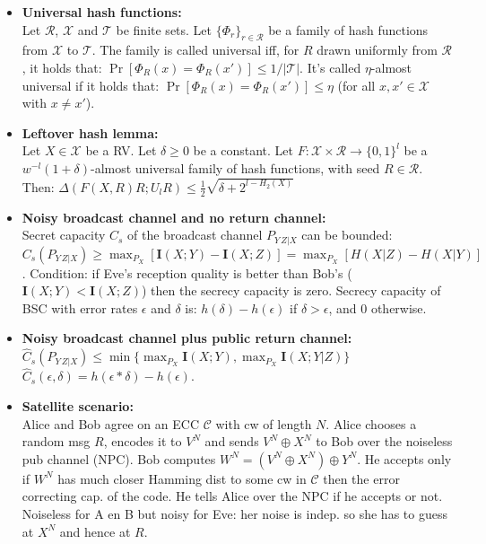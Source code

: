 \documentclass[twocolumn,9pt]{extarticle}
\begin{document}
\begin{itemize}

	\item \textbf{Universal hash functions:} \\
	Let $\mathcal{R}$, $\mathcal{X}$ and $\mathcal{T}$ be finite sets. Let $\{\Phi_r\}_{r \in \mathcal{R}}$ be a family of hash functions from $\mathcal{X}$ to $\mathcal{T}$. The family is called universal iff, for $R$ drawn uniformly from $\mathcal{R}$, it holds that: $\Pr[\Phi_R(x) = \Phi_R(x')] \leq 1/|\mathcal{T}|$. It's called $\eta$-almost universal if it holds that: $\Pr[\Phi_R(x) = \Phi_R(x')] \leq \eta$ (for all $x, x' \in \mathcal{X}$ with $x \neq x'$).

	\item \textbf{Leftover hash lemma: } \\
	Let $X \in \mathcal{X}$ be a RV. Let $\delta \geq 0$ be a constant. Let $F : \mathcal{X} \times \mathcal{R} \rightarrow \{0,1\}^l$ be a $w^{-l}(1+\delta)$-almost universal family of hash functions, with seed $R \in \mathcal{R}$. Then: $\Delta(F(X,R)R;U_lR) \leq \frac{1}{2}\sqrt{\delta + 2^{l-H_2(X)}}$

	\item \textbf{Noisy broadcast channel and no return channel: } \\
	Secret capacity $C_s$ of the broadcast channel $P_{Y\,Z|X}$ can be bounded:\\
	$C_s(P_{Y\,Z|X}) \geq \max_{P_X}[\mathbf{I}(X;Y) - \mathbf{I}(X;Z)] = \max_{P_X}[H(X|Z) - H(X|Y)]$. Condition: if Eve's reception quality is better than Bob's ($\mathbf{I}(X;Y) < \mathbf{I}(X;Z)$) then the secrecy capacity is zero. Secrecy capacity of BSC with error rates $\epsilon$ and $\delta$ is: $h(\delta) - h(\epsilon)$ if $\delta > \epsilon$, and $0$ otherwise.

	\item \textbf{Noisy broadcast channel plus public return channel:} \\
	$\hat{C}_s(P_{Y\,Z|X}) \leq \min\{\max_{P_X}\mathbf{I}(X;Y), \max_{P_X}\mathbf{I}(X;Y|Z)\}$\\
	$\hat{C}_s(\epsilon,\delta) = h(\epsilon * \delta) - h(\epsilon)$.

	\item \textbf{Satellite scenario: } \\
	Alice and Bob agree on an ECC $\mathcal{C}$ with cw of length $N$. Alice chooses a random msg $R$, encodes it to $V^N$ and sends $V^N \oplus X^N$ to Bob over the noiseless pub channel (NPC). Bob computes $W^N = (V^N \oplus X^N) \oplus Y^N$. He accepts only if $W^N$ has much closer Hamming dist to some cw in $\mathcal{C}$ then the error correcting cap. of the code. He tells Alice over the NPC if he accepts or not. Noiseless for A en B but noisy for Eve: her noise is indep. so she has to guess at $X^N$ and hence at $R$.


\end{itemize}
\end{document}
